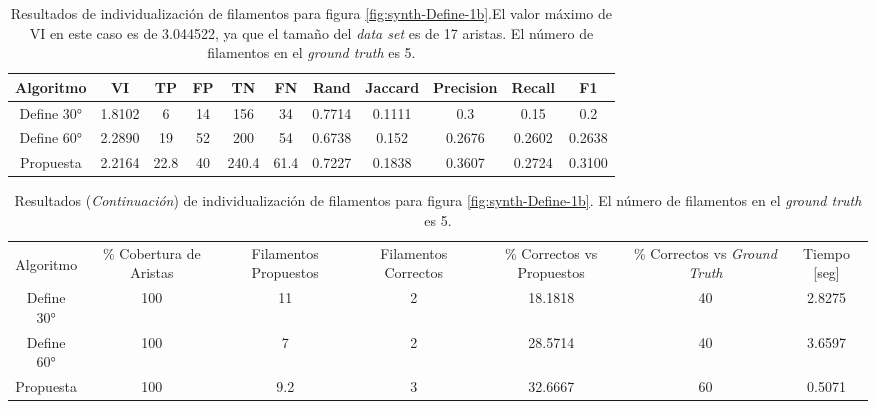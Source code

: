 \begin{table}[h]
    \centering
    \begin{tabular}{|c|c|c|c|c|c|c|c|c|c|c|}
    \hline
        Algoritmo & VI & TP & FP &TN &FN & Rand	& Jaccard &	Precision &	Recall &	F1 \\ \hline
        Define 30° & 1.8102 & 6 & 14 & 156  & 34 & 0.7714 & 0.1111  & 0.3 & 0.15 & 0.2\\
        Define 60° & 2.2890 & 19 & 52 & 200 & 54 & 0.6738 & 0.152 & 0.2676  & 0.2602  & 0.2638\\ 
        Propuesta & 2.2164 & 22.8 & 40 & 240.4 & 61.4 & 0.7227 & 0.1838 & 0.3607 & 0.2724 & 0.3100\\
        \hline
    \end{tabular}
    \caption{Resultados de individualizaci\'on de filamentos para figura \ref{fig:synth-Define-1b}.El valor m\'aximo de VI en este caso es de 3.044522, ya que el tama\~no del {\it data set} es de 17 aristas. El n\'umero de filamentos en el {\it ground truth} es 5.}
    \label{tab:synth-Define-1b}
\end{table}
\addtocounter{table}{-1}
\begin{table}[h]
    \centering
    \begin{tabular}{|c|c|c|c|c|c|c|}
    \hline
         & \multirow{4}{2cm}{\centering \% Cobertura de Aristas} & \multirow{4}{2cm}{Filamentos Propuestos} & \multirow{4}{2cm}{Filamentos Correctos} & \multirow{4}{2.5cm}{\% Correctos vs Propuestos} & \multirow{4}{2.5cm}{\centering \% Correctos vs {\it Ground Truth}} & \multirow{4}{1.2cm}{\centering Tiempo [seg]} \\
         &  &  &  & & &  \\
        Algoritmo &  &  &  & & &  \\
        &  &  &  & & &  \\ \hline
        Define 30° & 100 & 11 & 2 & 18.1818 & 40 & 2.8275\\
        Define 60° & 100 & 7 & 2 & 28.5714 & 40 & 3.6597\\ 
        Propuesta & 100 & 9.2 & 3 & 32.6667 & 60 & 0.5071\\
        \hline
    \end{tabular}
    \caption{Resultados ({\it Continuaci\'on}) de individualizaci\'on de filamentos para figura \ref{fig:synth-Define-1b}. El n\'umero de filamentos en el {\it ground truth} es 5.}
\end{table}

